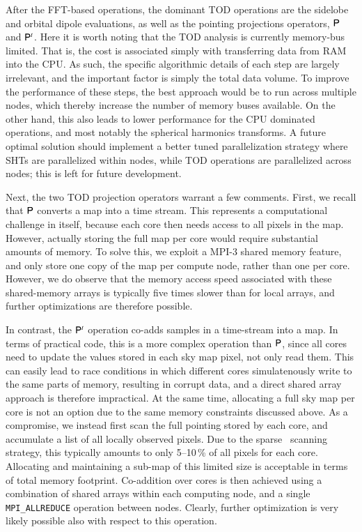 \documentclass[twocolumn]{aa}
\renewcommand{\P}[0]{\tens{P}}
\begin{document}
After the FFT-based operations, the dominant TOD operations are the
sidelobe and orbital dipole evaluations, as well as the pointing
projections operators, $\P$ and $\P^t$. Here it is worth noting that
the TOD analysis is currently memory-bus limited. That is, the cost is
associated simply with transferring data from RAM into the CPU. As
such, the specific algorithmic details of each step are largely
irrelevant, and the important factor is simply the total data
volume. To improve the performance of these steps, the best approach
would be to run across multiple nodes, which thereby increase the
number of memory buses available. On the other hand, this also leads
to lower performance for the CPU dominated operations, and most
notably the spherical harmonics transforms. A future optimal solution
should implement a better tuned parallelization strategy where SHTs
are parallelized within nodes, while TOD operations are parallelized
across nodes; this is left for future development.

Next, the two TOD projection operators warrant a few comments. First,
we recall that $\P$ converts a map into a time stream. This represents
a computational challenge in itself, because each core then needs
access to all pixels in the map. However, actually storing the full
map per core would require substantial amounts of memory. To solve
this, we exploit a MPI-3 shared memory feature, and only store one
copy of the map per compute node, rather than one per core. However,
we do observe that the memory access speed associated with these
shared-memory arrays is typically five times slower than for local
arrays, and further optimizations are therefore possible.

In contrast, the $\P^t$ operation co-adds samples in a time-stream
into a map. In terms of practical code, this is a more complex
operation than $\P$, since all cores need to update the values stored
in each sky map pixel, not only read them. This can easily lead to
race conditions in which different cores simulatenously write to the
same parts of memory, resulting in corrupt data, and a direct shared
array approach is therefore impractical. At the same time, allocating
a full sky map per core is not an option due to the same memory
constraints discussed above. As a compromise, we instead first scan
the full pointing stored by each core, and accumulate a list of all
locally observed pixels. Due to the sparse \Planck\ scanning strategy,
this typically amounts to only 5--10\,\% of all pixels for each
core. Allocating and maintaining a sub-map of this limited size is
acceptable in terms of total memory footprint. Co-addition over cores
is then achieved using a combination of shared arrays within each
computing node, and a single \texttt{MPI\_ALLREDUCE} operation between
nodes. Clearly, further optimization is very likely possible also with
respect to this operation.
\end{document}
